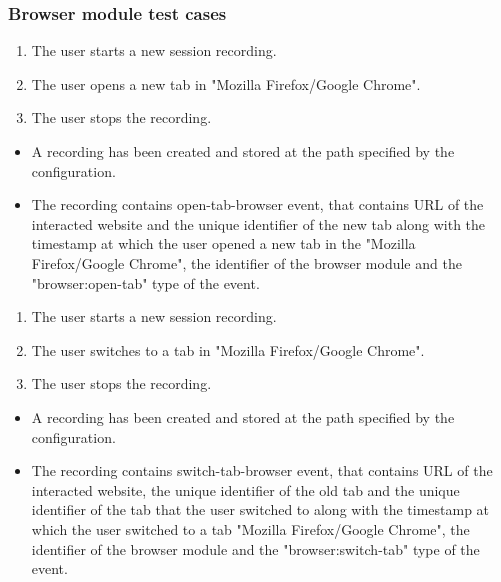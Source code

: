 \subsubsection{Browser module test cases}
\begin{tests}
	{\begin{enumerate}
		\item The \gls{user} starts a new session recording.
		\item The \gls{user} opens a new tab in "Mozilla Firefox/Google Chrome".
		\item The \gls{user} stops the recording.
	\end{enumerate}}
	{\begin{itemize}
		\item A recording has been created and stored at the path specified by the configuration.
		\item The recording contains open-tab-browser event, that contains URL of the interacted website and the unique identifier of the new tab along with the timestamp at which the user opened a new tab in the "Mozilla Firefox/Google Chrome", the identifier of the browser module and the "browser:open-tab" type of the event.
	\end{itemize}}
	
	{\begin{enumerate}
		\item The \gls{user} starts a new session recording.
		\item The \gls{user} switches to a tab in "Mozilla Firefox/Google Chrome".
		\item The \gls{user} stops the recording.
	\end{enumerate}}
	{\begin{itemize}
		\item A recording has been created and stored at the path specified by the configuration.
		\item The recording contains switch-tab-browser event, that contains URL of the interacted website, the unique identifier of the old tab and the unique identifier of the tab that the user switched to along with the timestamp at which the user switched to a tab "Mozilla Firefox/Google Chrome", the identifier of the browser module and the "browser:switch-tab" type of the event.
	\end{itemize}}
	

\end{tests}
